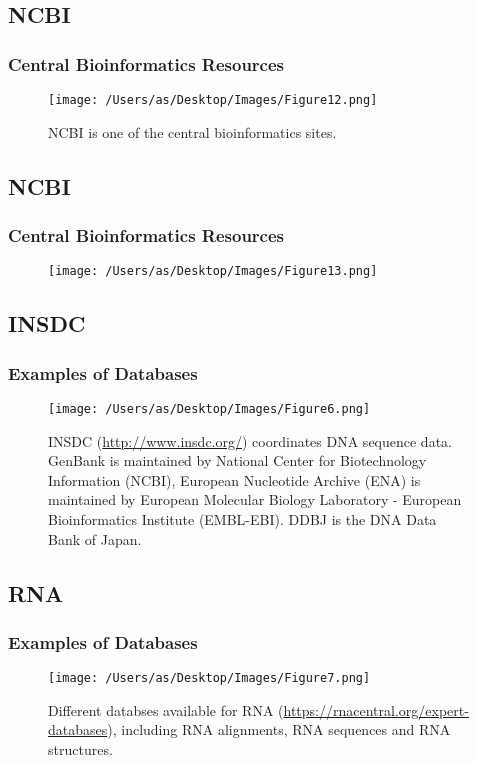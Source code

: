 \documentclass[11pt]{beamer}
\begin{document}
\subsection{NCBI}
\begin{frame}
\frametitle{Central Bioinformatics Resources}
\begin{center}
\begin{figure}
\texttt{[image: /Users/as/Desktop/Images/Figure12.png]}\vspace{0.2in}
\caption{NCBI is one of the central bioinformatics sites.}
\end{figure}
\end{center} 
\end{frame}

\subsection{NCBI}
\begin{frame}
\frametitle{Central Bioinformatics Resources}
\begin{center}
\begin{figure}
\texttt{[image: /Users/as/Desktop/Images/Figure13.png]}
\end{figure}
\end{center} 
\end{frame}

\subsection{INSDC}
\begin{frame}
\frametitle{Examples of Databases}
\begin{center}
\begin{figure}
\texttt{[image: /Users/as/Desktop/Images/Figure6.png]}
\caption{INSDC (\url{http://www.insdc.org/}) coordinates DNA sequence data. GenBank is maintained by National Center for Biotechnology Information (NCBI), European Nucleotide Archive (ENA) is maintained by European Molecular Biology Laboratory - European Bioinformatics Institute (EMBL-EBI). DDBJ is the DNA Data Bank of Japan.}
\end{figure}
\end{center} 
\end{frame}


\subsection{RNA}
\begin{frame}
\frametitle{Examples of Databases}
\begin{center}
\begin{figure}
\texttt{[image: /Users/as/Desktop/Images/Figure7.png]}
\caption{Different databses available for RNA (\url{https://rnacentral.org/expert-databases}), including RNA alignments, RNA sequences and RNA structures.}
\end{figure}
\end{center} 
\end{frame}
\end{document}
